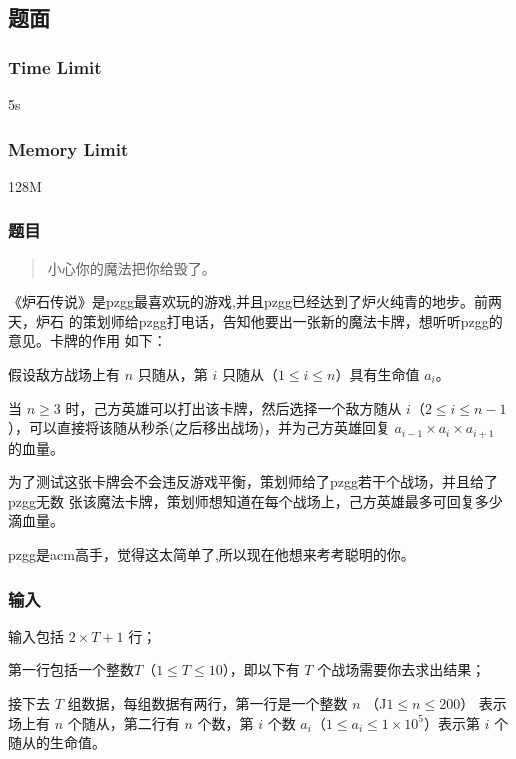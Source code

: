 \subsection{题面}

\subsubsection{Time Limit}
5s

\subsubsection{Memory Limit}
128M

\subsubsection{题目}
\begin{quote}
小心你的魔法把你给毁了。
\end{quote}

《炉石传说》是pzgg最喜欢玩的游戏,并且pzgg已经达到了炉火纯青的地步。前两天，炉石
的策划师给pzgg打电话，告知他要出一张新的魔法卡牌，想听听pzgg的意见。卡牌的作用
如下：

假设敌方战场上有 $n$ 只随从，第 $i$ 只随从（$1 \leq i \leq n$）具有生命值 $a_i$。

当 $n \geq 3$ 时，己方英雄可以打出该卡牌，然后选择一个敌方随从 $i$（$2 \leq i
\leq n-1$），可以直接将该随从秒杀(之后移出战场)，并为己方英雄回复 $a_{i−1} \times
a_i \times a_{i+1}$ 的血量。

为了测试这张卡牌会不会违反游戏平衡，策划师给了pzgg若干个战场，并且给了pzgg无数
张该魔法卡牌，策划师想知道在每个战场上，己方英雄最多可回复多少滴血量。

pzgg是acm高手，觉得这太简单了,所以现在他想来考考聪明的你。

\subsubsection{输入}
输入包括 $2 \times T+1$ 行；

第一行包括一个整数$T$（$1 \leq T \leq 10$），即以下有 $T$ 个战场需要你去求出结果；

接下去 $T$ 组数据，每组数据有两行，第一行是一个整数 $n$ （J$1 \leq n \leq 200$）
表示场上有 $n$ 个随从，第二行有 $n$ 个数，第 $i$ 个数 $a_i$（$1 \leq a_i \leq 1
\times 10^5$）表示第 $i$ 个随从的生命值。

